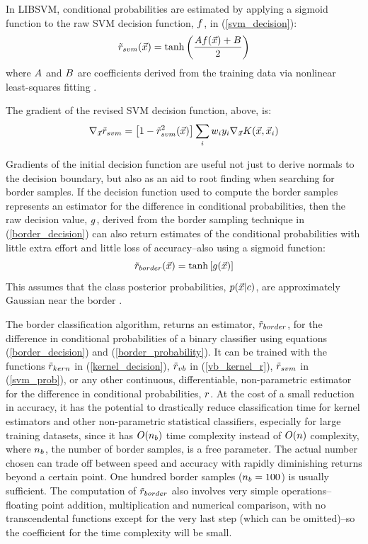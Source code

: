 \documentclass[11pt]{article}
\begin{document}
In LIBSVM, conditional probabilities are estimated by applying a
sigmoid function to
the raw SVM decision function, $f$, in (\ref{svm_decision}):
\begin{equation}
	\tilde r_{svm}(\vec {x}) = \tanh \left (\frac{A f(\vec {x})+ B}{2} \right )
	\label{svm_prob}
\end{equation}
where $A$ and $B$ are coefficients derived from
the training data via
nonlinear least-squares fitting \citep{Lin_etal2007, Chang_Lin2011}.

The gradient of the revised SVM decision function, above, is:
\begin{equation}
	\nabla_{\vec {x}} {\tilde r_{svm}} = \left [1 - \tilde r_{svm}^2(\vec {x}) \right ] \sum_i w_i y_i \nabla_{\vec {x}} K(\vec {x}, \vec {x}_i)
\end{equation}

Gradients of the initial decision function are useful not just to derive normals to
the decision boundary, but also as an aid to root finding when searching for
border samples. If the decision function used to compute the border samples
represents an estimator for the
difference in conditional probabilities, then the raw decision value,
$g$,
derived from the border sampling technique in (\ref{border_decision})
can also return estimates of the conditional probabilities with little
extra effort and little loss of accuracy--also using a sigmoid function:
\begin{equation}
	\tilde r_{border}(\vec {x}) = \tanh \left [g (\vec {x}) \right ]
	\label{border_probability}
\end{equation}
This assumes that the class posterior probabilities,
$p(\vec {x} | c)$, are approximately Gaussian near the border
\citep{Mills2011}.

The border classification algorithm, returns an estimator,
$\tilde r_{border}$, for the difference in conditional probabilities of
a binary classifier using
equations (\ref{border_decision}) and (\ref{border_probability}).
It can be trained with the functions $\tilde r_{kern}$ in (\ref{kernel_decision}),
$\tilde r_{vb}$ in (\ref{vb_kernel_r}), $\tilde r_{svm}$ in (\ref{svm_prob}),
or any other 
continuous, differentiable, non-parametric estimator for the difference
in conditional probabilities, $r$.
At the cost of a small reduction in accuracy,
it has the potential to drastically reduce classification time for kernel
estimators and other non-parametric statistical classifiers,
especially for large training datasets,
since it has $O(n_b)$ time complexity instead of $O(n)$
complexity, where $n_b$, the number of border samples, is a free parameter.
The actual number chosen
can trade off between speed and accuracy with rapidly diminishing returns
beyond a certain point. 
One hundred border samples ($n_b=100$) is usually sufficient.
The computation of $\tilde r_{border}$ also involves very simple operations--
floating point addition, multiplication and numerical comparison, with no
transcendental functions except for the very last step (which can be omitted)--so the coefficient for the time complexity will be small.
\end{document}
